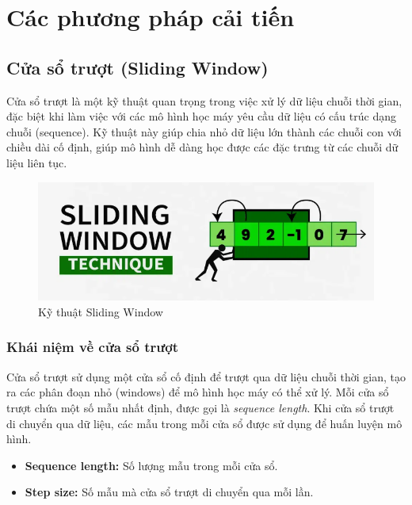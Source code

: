 \section{Các phương pháp cải tiến}
\subsection{Cửa sổ trượt (Sliding Window)}

Cửa sổ trượt là một kỹ thuật quan trọng trong việc xử lý dữ liệu chuỗi thời gian, đặc biệt khi làm việc với các mô hình học máy yêu cầu dữ liệu có cấu trúc dạng chuỗi (sequence). Kỹ thuật này giúp chia nhỏ dữ liệu lớn thành các chuỗi con với chiều dài cố định, giúp mô hình dễ dàng học được các đặc trưng từ các chuỗi dữ liệu liên tục.

\begin{figure}[H]
    \centering
    \includegraphics[width=\textwidth,height=\textheight,keepaspectratio]{Images/Improved methods/SlidingWindowTechnique.png}
    \caption{Kỹ thuật Sliding Window}
    \label{fig:enter-label}
\end{figure}

\subsubsection{Khái niệm về cửa sổ trượt}

Cửa sổ trượt sử dụng một cửa sổ cố định để trượt qua dữ liệu chuỗi thời gian, tạo ra các phân đoạn nhỏ (windows) để mô hình học máy có thể xử lý. Mỗi cửa sổ trượt chứa một số mẫu nhất định, được gọi là \textit{sequence length}. Khi cửa sổ trượt di chuyển qua dữ liệu, các mẫu trong mỗi cửa sổ được sử dụng để huấn luyện mô hình.

\begin{itemize}
    \item \textbf{Sequence length:} Số lượng mẫu trong mỗi cửa sổ.
    \item \textbf{Step size:} Số mẫu mà cửa sổ trượt di chuyển qua mỗi lần.
\end{itemize}

